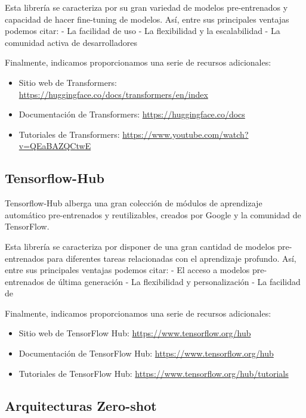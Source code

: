 \documentclass[
  a4paper,
  DIV=11,
  numbers=noendperiod]{scrreprt}
\providecommand{\tightlist}{%
  \setlength{\itemsep}{0pt}\setlength{\parskip}{0pt}}\usepackage{longtable,booktabs,array}
\begin{document}
Esta librería se caracteriza por su gran variedad de modelos
pre-entrenados y capacidad de hacer fine-tuning de modelos. Así, entre
sus principales ventajas podemos citar: - La facilidad de uso - La
flexibilidad y la escalabilidad - La comunidad activa de desarrolladores

Finalmente, indicamos proporcionamos una serie de recursos adicionales:

\begin{itemize}
\tightlist
\item
  Sitio web de Transformers:
  \url{https://huggingface.co/docs/transformers/en/index}
\item
  Documentación de Transformers: \url{https://huggingface.co/docs}
\item
  Tutoriales de Transformers:
  \url{https://www.youtube.com/watch?v=QEaBAZQCtwE}
\end{itemize}

\subsection{Tensorflow-Hub}\label{tensorflow-hub}

Tensorflow-Hub alberga una gran colección de módulos de aprendizaje
automático pre-entrenados y reutilizables, creados por Google y la
comunidad de TensorFlow.

Esta librería se caracteriza por disponer de una gran cantidad de
modelos pre-entrenados para diferentes tareas relacionadas con el
aprendizaje profundo. Así, entre sus principales ventajas podemos citar:
- El acceso a modelos pre-entrenados de última generación - La
flexibilidad y personalización - La facilidad de

Finalmente, indicamos proporcionamos una serie de recursos adicionales:

\begin{itemize}
\tightlist
\item
  Sitio web de TensorFlow Hub: \url{https://www.tensorflow.org/hub}
\item
  Documentación de TensorFlow Hub: \url{https://www.tensorflow.org/hub}
\item
  Tutoriales de TensorFlow Hub:
  \url{https://www.tensorflow.org/hub/tutorials}
\end{itemize}

\subsection{Arquitecturas Zero-shot}\label{arquitecturas-zero-shot}
\end{document}
